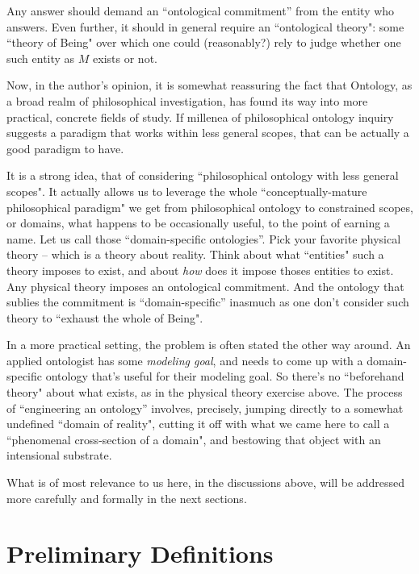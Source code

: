 \documentclass[11pt,a4paper]{article}
\begin{document}
Any answer should demand an ``ontological commitment'' from the entity who answers. Even further, it should in general require an ``ontological theory": some ``theory of Being" over which one could (reasonably?) rely to judge whether one such entity as $M$ exists or not.

Now, in the author's opinion, it is somewhat reassuring the fact that Ontology, as a broad realm of philosophical investigation, has found its way into more practical, concrete fields of study. If millenea of philosophical ontology inquiry suggests a paradigm that works within less general scopes, that can be actually a good paradigm to have. 

It is a strong idea, that of considering ``philosophical ontology with less general scopes". It actually allows us to leverage the whole ``conceptually-mature philosophical paradigm" we get from philosophical ontology to constrained scopes, or domains, what happens to be occasionally useful, to the point of earning a name. Let us call those ``domain-specific ontologies''. Pick your favorite physical theory -- which is a theory about reality. Think about what ``entities" such a theory imposes to exist, and about \textit{how} does it impose thoses entities to exist. Any physical theory imposes an ontological commitment. And the ontology that sublies the commitment is ``domain-specific'' inasmuch as one don't consider such theory to ``exhaust the whole of Being".

In a more practical setting, the problem is often stated the other way around. An applied ontologist has some \textit{modeling goal}, and needs to come up with a domain-specific ontology that's useful for their modeling goal. So there's no ``beforehand theory" about what exists, as in the physical theory exercise above. The process of ``engineering an ontology'' involves, precisely, jumping directly to a somewhat undefined ``domain of reality", cutting it off with what we came here to call a ``phenomenal cross-section of a domain", and bestowing that object with an intensional substrate. 

What is of most relevance to us here, in the discussions above, will be addressed more carefully and formally in the next sections.

\section{Preliminary Definitions}
\end{document}
